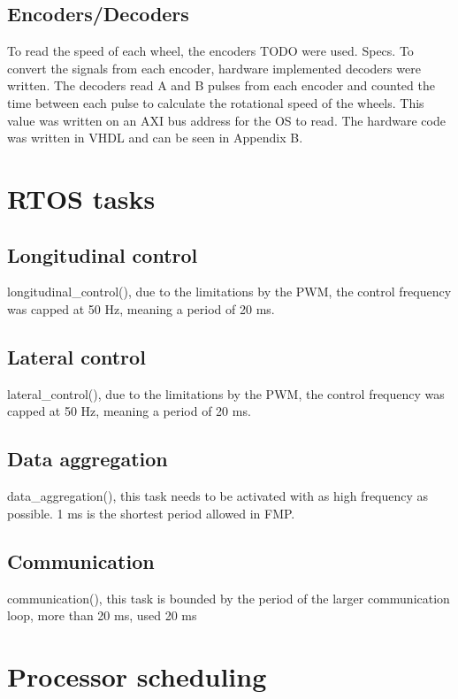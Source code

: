 \subsection{Encoders/Decoders}
To read the speed of each wheel, the encoders TODO were used. Specs. To convert the signals from each encoder, hardware implemented decoders were written. The decoders read A and B pulses from each encoder and counted the time between each pulse to calculate the rotational speed of the wheels. This value was written on an AXI bus address for the OS to read. The hardware code was written in VHDL and can be seen in Appendix B.

\section{RTOS tasks}

\subsection{Longitudinal control}
longitudinal\_control(), due to the limitations by the PWM, the control frequency was capped at 50 Hz, meaning a period of 20 ms. 

\subsection{Lateral control}
lateral\_control(), due to the limitations by the PWM, the control frequency was capped at 50 Hz, meaning a period of 20 ms.

\subsection{Data aggregation}
data\_aggregation(), this task needs to be activated with as high frequency as possible. 1 ms is the shortest period allowed in FMP.

\subsection{Communication}
communication(), this task is bounded by the period of the larger communication loop, more than 20 ms, used 20 ms

\section{Processor scheduling}

\begin{RTGrid}{2}{20}
\end{RTGrid}

